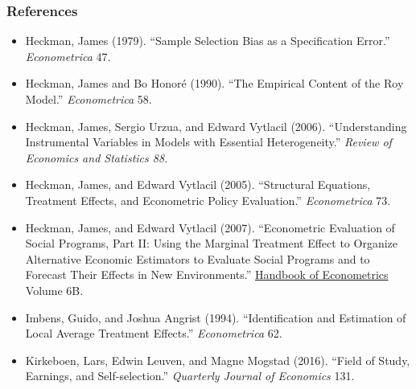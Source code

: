 \documentclass[blue]{beamer}
\begin{document}
{{\frametitle{References}
\begin{itemize}
\item {\scriptsize Heckman, James (1979). ``Sample Selection Bias as a Specification
Error.'' }{\scriptsize\emph{Econometrica }}{\scriptsize 47.}{\scriptsize\par}
\item {\scriptsize Heckman, James and Bo Honor\'e (1990). \textquotedblleft The
Empirical Content of the Roy Model.\textquotedblright{} }{\scriptsize\textit{Econometrica}}{\scriptsize{}
58.}{\scriptsize\par}
\item {\scriptsize Heckman, James, Sergio Urzua, and Edward Vytlacil (2006).
``Understanding Instrumental Variables in Models with Essential Heterogeneity.''
}{\scriptsize\emph{Review of Economics and Statistics 88.}}{\scriptsize\par}
\item {\scriptsize Heckman, James, and Edward Vytlacil (2005). ``Structural
Equations, Treatment Effects, and Econometric Policy Evaluation.''
}{\scriptsize\emph{Econometrica }}{\scriptsize 73.}{\scriptsize\par}
\item {\scriptsize Heckman, James, and Edward Vytlacil (2007). ``Econometric
Evaluation of Social Programs, Part II: Using the Marginal Treatment
Effect to Organize Alternative Economic Estimators to Evaluate Social
Programs and to Forecast Their Effects in New Environments.'' }{\scriptsize\uline{Handbook
of Econometrics}}{\scriptsize{} Volume 6B.}{\scriptsize\par}
\item {\scriptsize Imbens, Guido, and Joshua Angrist (1994). ``Identification
and Estimation of Local Average Treatment Effects.'' }{\scriptsize\emph{Econometrica
}}{\scriptsize 62.}{\scriptsize\par}
\item {\scriptsize Kirkeboen, Lars, Edwin Leuven, and Magne Mogstad (2016).
``Field of Study, Earnings, and Self-selection.'' }{\scriptsize\emph{Quarterly
Journal of Economics }}{\scriptsize 131.}{\scriptsize\par}
\end{itemize}
}

\frame{ 

}}
\end{document}
